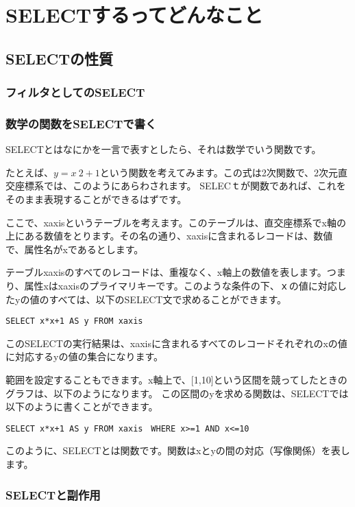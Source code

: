 \chapter{SELECTするってどんなこと}


\section{SELECTの性質}

\subsection{フィルタとしてのSELECT}

\subsection{数学の関数をSELECTで書く}

SELECTとはなにかを一言で表すとしたら、それは数学でいう関数です。

たとえば、$y=x~2+1$という関数を考えてみます。この式は2次関数で、2次元直交座標系では、このようにあらわされます。
SELECｔが関数であれば、これをそのまま表現することができるはずです。

ここで、xaxisというテーブルを考えます。このテーブルは、直交座標系でx軸の上にある数値をとります。その名の通り、xaxisに含まれるレコードは、数値で、属性名がxであるとします。

テーブルxaxisのすべてのレコードは、重複なく、x軸上の数値を表します。つまり、属性xはxaxisのプライマリキーです。このような条件の下、ｘの値に対応したyの値のすべては、以下のSELECT文で求めることができます。

\begin{verbatim}
SELECT x*x+1 AS y FROM xaxis
\end{verbatim}

このSELECTの実行結果は、xaxisに含まれるすべてのレコードそれぞれのxの値に対応するyの値の集合になります。

範囲を設定することもできます。x軸上で、[1,10]という区間を競ってしたときのグラフは、以下のようになります。
この区間のyを求める関数は、SELECTでは以下のように書くことができます。

\begin{verbatim}
SELECT x*x+1 AS y FROM xaxis　WHERE x>=1 AND x<=10
\end{verbatim}

このように、SELECTとは関数です。関数はxとyの間の対応（写像関係）を表します。

\subsection{SELECTと副作用}

